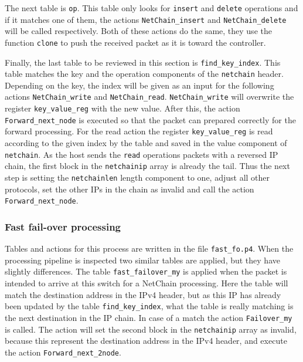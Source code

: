 \documentclass[11pt,oneside,a4paper]{article}
\begin{document}
The next table is {\color{red}\texttt{op}}. This table only looks for {\color{brown}\texttt{insert}} and {\color{brown}\texttt{delete}} operations and if it matches one of them, the actions {\color{red}\texttt{NetChain\_insert}} and {\color{red}\texttt{NetChain\_delete}} will be called respectively. Both of these actions do the same, they use the function {\color{brown}\texttt{clone}} to push the received packet as it is toward the controller. 

Finally, the last table to be reviewed in this section is {\color{red}\texttt{find\_key\_index}}. This table matches the key and the operation components of the {\color{red}\texttt{netchain}} header. Depending on the key, the index will be given as an input for the following actions {\color{red}\texttt{NetChain\_write}} and {\color{red}\texttt{NetChain\_read}}. {\color{red}\texttt{NetChain\_write}}  will overwrite the register  {\color{red}\texttt{key\_value\_reg}} with the new value. After this, the action {\color{red}\texttt{Forward\_next\_node}} is executed so that the packet can prepared correctly for the forward processing. For the read action the  register {\color{red}\texttt{key\_value\_reg}} is read according to the given index by the table and saved in the value component of {\color{red}\texttt{netchain}}. As the host sends the {\color{brown}\texttt{read}} operations packets with a reversed IP chain, the first block in the {\color{red}\texttt{netchainip}} array is already the tail. Thus the next step is setting the {\color{red}\texttt{netchainlen}} length component to one, adjust all other protocols, set the other IPs in the chain as invalid and call the action {\color{red}\texttt{Forward\_next\_node}}. 

\subsubsection{Fast fail-over processing}

Tables and actions for this process are written in the file {\color{red}\texttt{fast\_fo.p4}}. When the processing pipeline is inspected two similar tables are applied, but they have slightly differences. The table {\color{red}\texttt{fast\_failover\_my}} is applied when the packet is intended to arrive at this switch for a NetChain processing. Here the table will match the destination address in the IPv4 header, but as this IP has already been updated by the table {\color{red}\texttt{find\_key\_index}}, what the table is really matching is the next destination in the IP chain. In case of a match the action {\color{red}\texttt{Failover\_my}} is called. The action will set the second block in the {\color{red}\texttt{netchainip}} array as invalid, because this represent the destination address in the IPv4 header, and execute the action {\color{red}\texttt{Forward\_next\_2node}}.
\end{document}
